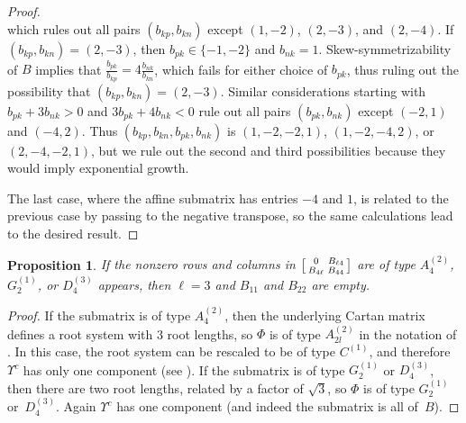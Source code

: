 \documentclass{amsart}
\newtheorem{proposition}{Proposition}[section]
\theoremstyle{definition}
\theoremstyle{remark}
\numberwithin{equation}{section}
\newcommand{\set}[1]{{\lbrace #1 \rbrace}}
\newcommand{\0}{{\mathbf{0}}}
\newcommand{\RSChar}{\Phi}
\newcommand{\RS}{\RSChar}
\newcommand{\RSTChar}{\Upsilon}
\newcommand{\RST}[1]{\RSTChar^{#1}}
\begin{document}
\begin{proof}
\[\]
which rules out all pairs $(b_{kp},b_{kn})$ except $(1,-2)$, $(2,-3)$, and $(2,-4)$.
If $(b_{kp},b_{kn})=(2,-3)$, then $b_{pk}\in\set{-1,-2}$ and $b_{nk}=1$.
Skew-symmetrizability of $B$ implies that $\frac{b_{pk}}{b_{kp}}=4\frac{b_{nk}}{b_{kn}}$, which fails for either choice of $b_{pk}$, thus ruling out the possibility that $(b_{kp},b_{kn})=(2,-3)$.
Similar considerations starting with $b_{pk}+3b_{nk}>0$ and $3b_{pk}+4b_{nk}<0$ rule out all pairs $(b_{pk},b_{nk})$ except $(-2,1)$ and $(-4,2)$.
Thus $(b_{kp},b_{kn},b_{pk},b_{nk})$ is $(1,-2,-2,1)$, $(1,-2,-4,2)$, or $(2,-4,-2,1)$, but we rule out the second and third possibilities because they would imply exponential growth.

The last case, where the affine submatrix has entries $-4$ and $1$, is related to the previous case by passing to the negative transpose, so the same calculations lead to the desired result.
\end{proof}

\begin{proposition}\label{one component}
If the nonzero rows and columns in $\begin{bsmallmatrix} 0 & B_{\ell4} \\ B_{4\ell} & B_{44} \end{bsmallmatrix}$ are of type $A_{4}^{(2)}$, $G_{2}^{(1)}$, or $D_{4}^{(3)}$ appears, then $\ell=3$ and $B_{11}$ and $B_{22}$ are empty.
\end{proposition}
\begin{proof}
If the submatrix is of type $A_{4}^{(2)}$, then the underlying Cartan matrix defines a root system with 3 root lengths, so $\RS$ is of type $A_{2l}^{(2)}$ in the notation of \cite[Chapter~4]{Kac}.
In this case, the root system can be rescaled to be of type $C^{(1)}$, and therefore $\RST{c}$ has only one component (see \cite[Table 1]{affdenom}).
If the submatrix is of type $G_{2}^{(1)}$ or $D_{4}^{(3)}$, then there are two root lengths, related by a factor of $\sqrt{3}$, so $\RS$ is of type $G_{2}^{(1)}$ or~$D_{4}^{(3)}$.
Again $\RST{c}$ has one component (and indeed the submatrix is all of~$B$).
\end{proof}
\end{document}
